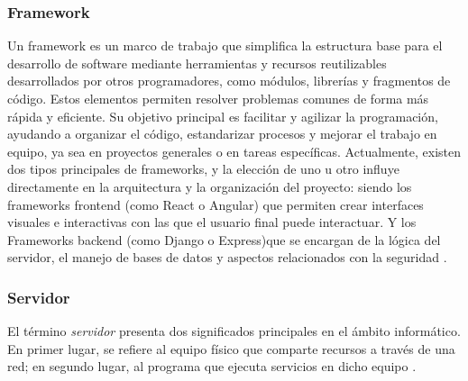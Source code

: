 \subsubsection{Framework}
Un framework es un marco de trabajo que simplifica la estructura base para el
desarrollo de software mediante herramientas y recursos reutilizables desarrollados
por otros programadores, como módulos, librerías y fragmentos de código. Estos
elementos permiten resolver problemas comunes de forma más rápida y eficiente.
Su objetivo principal es facilitar y agilizar la programación, ayudando a organizar el
código, estandarizar procesos y mejorar el trabajo en equipo, ya sea en proyectos
generales o en tareas específicas.
Actualmente, existen dos tipos principales de frameworks, y la elección de uno u
otro influye directamente en la arquitectura y la organización del proyecto:
siendo los frameworks frontend (como React o Angular) que permiten crear interfaces
visuales e interactivas con las que el usuario final puede interactuar.
Y los Frameworks backend (como Django o Express)que se encargan de la lógica del
servidor, el manejo de bases de datos y aspectos relacionados con la
seguridad  \cite{CampaGarcia2024}.

\subsubsection{Servidor}

El término \textit{servidor} presenta dos significados principales en el ámbito informático. 
En primer lugar, se refiere al equipo físico que comparte recursos a través de una red; 
en segundo lugar, al programa que ejecuta servicios en dicho equipo \cite{2025e}. 
\newline

